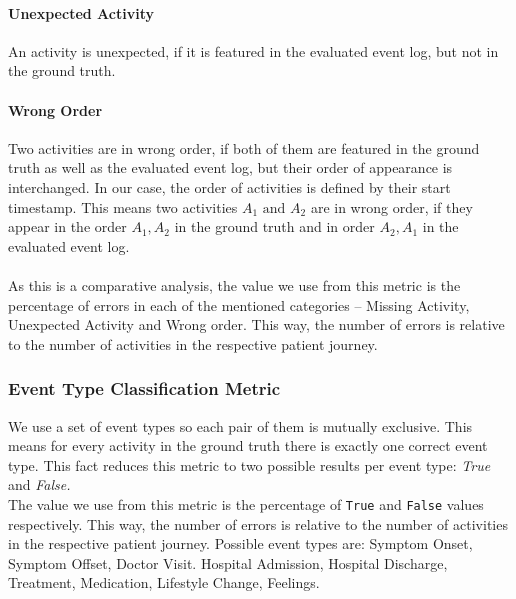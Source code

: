 \paragraph{Unexpected Activity} An activity is unexpected, if it is featured in the evaluated event log, but not in the ground truth.
\paragraph{Wrong Order} Two activities are in wrong order, if both of them are featured in the ground truth as well as the evaluated event log, but their order of appearance is interchanged. In our case, the order of activities is defined by their start timestamp. This means two activities $A_1 \text{ and } A_2$ are in wrong order, if they appear in the order $A_1,A_2$ in the ground truth and in order $A_2, A_1$ in the evaluated event log.\\\\
As this is a comparative analysis, the value we use from this metric is the percentage of errors in each of the mentioned categories – Missing Activity, Unexpected Activity and Wrong order. This way, the number of errors is relative to the number of activities in the respective patient journey.

\subsubsection{Event Type Classification Metric}\label{sec:eventtype_metric}
We use a set of event types so each pair of them is mutually exclusive. This means for every activity in the ground truth there is exactly one correct event type. This fact reduces this metric to two possible results per event type: \emph{True} and \emph{False.}\\
The value we use from this metric is the percentage of \verb|True| and \verb|False| values respectively. This way, the number of errors is relative to the number of activities in the respective patient journey.
Possible event types are: Symptom Onset, Symptom Offset, Doctor Visit. Hospital Admission, Hospital Discharge, Treatment, Medication, Lifestyle Change, Feelings.

